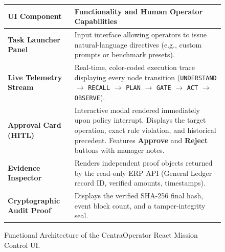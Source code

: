 \begin{figure}[htbp]
  \centering
  \small
  \begin{tabularx}{\textwidth}{p{4.2cm} X}
    \toprule
    \textbf{UI Component} & \textbf{Functionality and Human Operator Capabilities} \\
    \midrule
    \textbf{Task Launcher Panel} & Input interface allowing operators to issue natural-language directives (e.g., custom prompts or benchmark presets). \\
    \addlinespace
    \textbf{Live Telemetry Stream} & Real-time, color-coded execution trace displaying every node transition (\texttt{UNDERSTAND} $\to$ \texttt{RECALL} $\to$ \texttt{PLAN} $\to$ \texttt{GATE} $\to$ \texttt{ACT} $\to$ \texttt{OBSERVE}). \\
    \addlinespace
    \textbf{Approval Card (HITL)} & Interactive modal rendered immediately upon policy interrupt. Displays the target operation, exact rule violation, and historical precedent. Features \textbf{Approve} and \textbf{Reject} buttons with manager notes. \\
    \addlinespace
    \textbf{Evidence Inspector} & Renders independent proof objects returned by the read-only ERP API (General Ledger record ID, verified amounts, timestamps). \\
    \addlinespace
    \textbf{Cryptographic Audit Proof} & Displays the verified SHA-256 final hash, event block count, and a tamper-integrity seal. \\
    \bottomrule
  \end{tabularx}
  \caption{Functional Architecture of the CentraOperator React Mission Control UI.}
  \label{tab:ui_components}
\end{figure}

